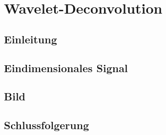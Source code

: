 %
%
%
\chapter{Wavelet-Deconvolution\label{chapter:deconvolve}}
\begin{refsection}

\section{Einleitung}


\section{Eindimensionales Signal}


\section{Bild}


\section{Schlussfolgerung}


\printbibliography[heading=subbibliography]
\end{refsection}
